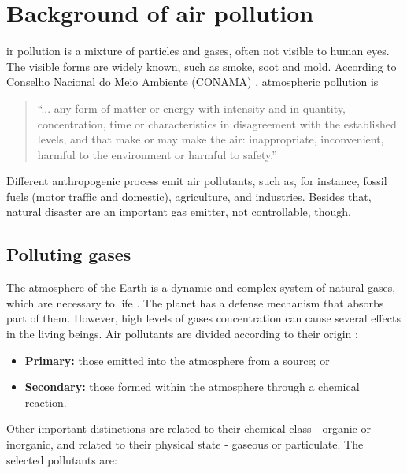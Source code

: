 \section{Background of air pollution}
\label{sec:background}

ir pollution is a mixture of particles and gases, often not visible to human
eyes. The visible forms are widely known, such as smoke, soot and mold.
According to Conselho Nacional do Meio Ambiente (CONAMA)
\cite{conama-air-pollution}, atmospheric pollution is 

\begin{quotation}
    ``... any form of matter or energy with intensity and in quantity,
    concentration, time or characteristics in disagreement with the
    established levels, and that make or may make the air: inappropriate,
    inconvenient, harmful to the environment or harmful to safety.''
\end{quotation}

Different anthropogenic process emit air pollutants, such as, for instance,
fossil fuels (motor traffic and domestic), agriculture, and industries.
Besides that, natural disaster are an important gas emitter, not controllable,
though. 

\subsection{Polluting gases}
\label{sec:polluting-gases}

The atmosphere of the Earth is a dynamic and complex system of natural gases,
which are necessary to life \cite{gases}. The planet has a defense mechanism
that absorbs part of them. However, high levels of gases concentration can cause several effects in the
living beings. Air pollutants are divided according to their origin \cite{who2006}: 

\begin{itemize}
    \item {\bf Primary:} those emitted into the atmosphere from a source; or
    \item {\bf Secondary:} those formed within the atmosphere through a
    chemical reaction.
\end{itemize}

Other important distinctions are related to their chemical class - organic or
inorganic, and related to their physical state - gaseous or particulate. The
selected pollutants are: 

